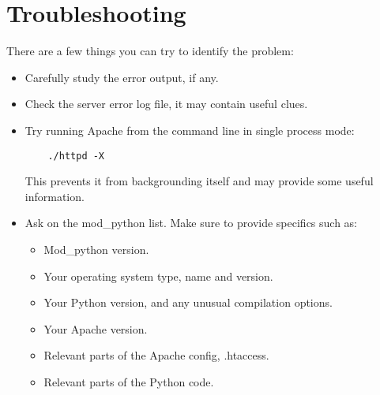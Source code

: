 \section{Troubleshooting\label{inst-trouble}}

There are a few things you can try to identify the problem: 

\begin{itemize}

\item Carefully study the error output, if any. 

\item Check the server error log file, it may contain useful clues. 

\item Try running Apache from the command line in single process mode:
  \begin{verbatim}
    ./httpd -X
  \end{verbatim}
  This prevents it from backgrounding itself and may provide some useful
  information.

\item
  Ask on the mod_python list. Make sure to provide specifics such as:

  \begin{itemize}

  \item Mod_python version.
  \item Your operating system type, name and version.
  \item Your Python version, and any unusual compilation options.
  \item Your Apache version.
  \item Relevant parts of the Apache config, .htaccess.
  \item Relevant parts of the Python code.

  \end{itemize}

\end{itemize}
